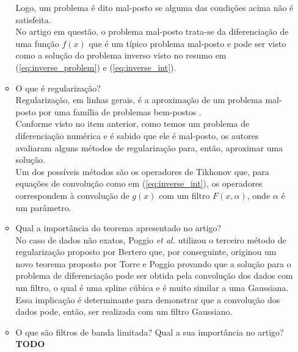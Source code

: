 \documentclass[12pt]{article}
\begin{document}
\begin{itemize}
\begin{itemize}
Logo, um problema é dito mal-posto se alguma das condições acima não é satisfeita.  
\\No artigo em questão, o problema mal-posto trata-se da diferenciação de uma função $f(x)$ que é um típico problema mal-posto e pode ser visto como a solução do problema inverso visto no resumo em (\ref{eq:inverse_problem}) e (\ref{eq:inverse_int}).\\

\item O que é regularização?
\\Regularização, em linhas gerais, é a aproximação de um problema mal-posto por uma família de problemas bem-postos \cite{Engl-1981}.
\\Conforme visto no item anterior, como temos um problema de diferenciação numérica e é sabido que ele é mal-posto, os autores 
avaliaram alguns métodos de regularização para, então, aproximar uma solução.
\\Um dos possíveis métodos são os operadores de Tikhonov que, para equações de convolução como em (\ref{eq:inverse_int}),
os operadores correspondem à convolução de $g(x)$ com um filtro $F(x, \alpha)$, onde $\alpha$ é um parâmetro.\\

\item Qual a importância do teorema apresentado no artigo?
\\No caso de dados não exatos, Poggio \textit{et al.} \cite{Poggio1988106} utilizou o terceiro método de regularização proposto por Bertero que, por conseguinte, originou um novo teorema proposto por Torre e Poggio provando que a solução para o problema de diferenciação pode ser obtida pela convolução dos dados com um filtro, o qual é uma spline cúbica e é muito similar a uma Gaussiana.\\
    Essa implicação é determinante para demonstrar que a convolução dos dados pode, então, ser realizada com um filtro Gaussiano.\\

\item O que são filtros de banda limitada? Qual a sua importância no artigo?
\textbf{TODO}\\


\end{itemize}
\end{itemize}
\end{document}
